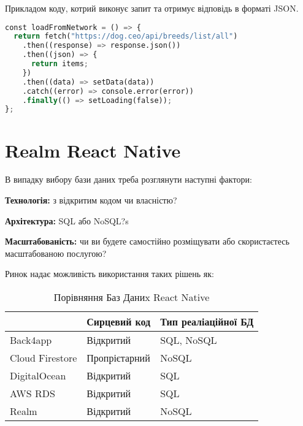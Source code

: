 Прикладом коду, котрий виконує запит та отримує відповідь в форматі JSON.

\begin{lstlisting}[style=light, language=Python,label={lst:rn_network},caption=React Native Network Call]
const loadFromNetwork = () => {
  return fetch("https://dog.ceo/api/breeds/list/all")
    .then((response) => response.json())
    .then((json) => {
      return items;
    })
    .then((data) => setData(data))
    .catch((error) => console.error(error))
    .finally(() => setLoading(false));
};
\end{lstlisting}


\section{Realm React Native}
\label{section.2.6}
В випадку вибору бази даних треба розглянути наступні фактори:
\begin{itemize}
    \begin{item}
        \textbf{Технологія:} з відкритим кодом чи власністю?
    \end{item}
    \begin{item}
        \textbf{Архітектура:} SQL або NoSQL?s
    \end{item}
    \begin{item}
        \textbf{Масштабованість:} чи ви будете самостійно розміщувати або скористаєтесь масштабованою послугою?
    \end{item}
\end{itemize}

Ринок надає можливість використання таких рішень як:

\begin{longtable}[c]{|l|l|l|}
    \caption{Порівняння Баз Даниx React Native}
    \label{tab:rn_db_comparison} \\
    \hline
    & Сирцевий код  & Тип реаліаційної БД \\ \hline
    \endhead
%
    Back4app        & Відкритий     & SQL, NoSQL          \\ \hline
    Cloud Firestore & Пропрієтарний & NoSQL               \\ \hline
    DigitalOcean    & Відкритий     & SQL                 \\ \hline
    AWS RDS         & Відкритий     & SQL                 \\ \hline
    Realm           & Відкритий     & NoSQL               \\ \hline
\end{longtable}

